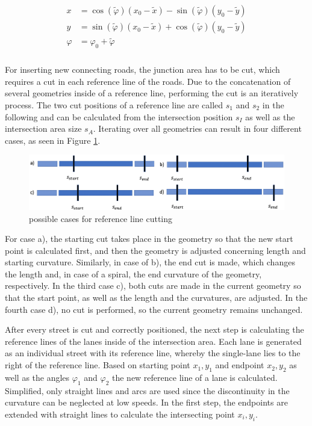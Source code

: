 \documentclass[a4paper, 10pt, conference]{ieeeconf}      %
\begin{document}
    \begin{align} \label{eq2}
        \begin{split}
            x &= \cos(\tilde{\varphi}) \left(x_0-\tilde{x}\right) - \sin(\tilde{\varphi}) \left(y_0-\tilde{y}\right) \\
            y &= \sin(\tilde{\varphi}) \left(x_0-\tilde{x}\right) + \cos(\tilde{\varphi}) \left(y_0-\tilde{y}\right) \\
            \varphi &= \varphi_0 + \tilde{\varphi} \\
        \end{split}
    \end{align}

    For inserting new connecting roads, the junction area has to be cut, which requires a cut in each reference line of the roads. Due to the concatenation of several geometries inside of a reference line, performing the cut is an iteratively process. The two cut positions of a reference line are called \(s_{1}\) and \(s_{2}\) in the following and can be calculated from the intersection position \(s_I\) as well as the intersection area size \(s_A\). Iterating over all geometries can result in four different cases, as seen in Figure \ref{fig_geometryCut}. 
    \begin{figure}[]    
        \includegraphics[width= \columnwidth]{fig/geometryCut.pdf}
        \caption{possible cases for reference line cutting}
        \label{fig_geometryCut}
    \end{figure}

    For case a), the starting cut takes place in the geometry so that the new start point is calculated first, and then the geometry is adjusted concerning length and starting curvature. Similarly, in case of b), the end cut is made, which changes the length and, in case of a spiral, the end curvature of the geometry, respectively. In the third case c), both cuts are made in the current geometry so that the start point, as well as the length and the curvatures, are adjusted. In the fourth case d), no cut is performed, so the current geometry remains unchanged.

    After every street is cut and correctly positioned, the next step is calculating the reference lines of the lanes inside of the intersection area. Each lane is generated as an individual street with its reference line, whereby the single-lane lies to the right of the reference line. Based on starting point \(x_{1}, y_1\) and endpoint \(x_{2}, y_2\) as well as the angles \(\varphi_{1}\) and \(\varphi_{2}\) the new reference line of a lane is calculated. Simplified, only straight lines and arcs are used since the discontinuity in the curvature can be neglected at low speeds. In the first step, the endpoints are extended with straight lines to calculate the intersecting point \(x_i, y_i\).
\end{document}
